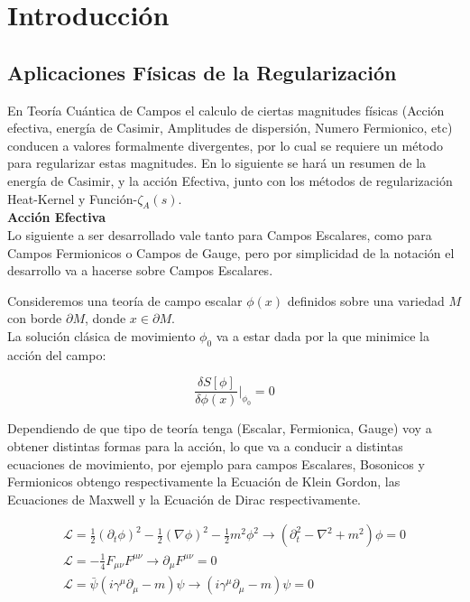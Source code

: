 \chapter{Introducción}


\section{Aplicaciones Físicas de la Regularización}

En Teoría Cuántica de Campos el calculo de ciertas magnitudes físicas (Acción efectiva, energía de Casimir, Amplitudes de dispersión, Numero Fermionico, etc) conducen a valores formalmente divergentes, por lo cual se requiere un método para regularizar estas magnitudes. En lo siguiente se hará un resumen de la energía de Casimir, y la acción Efectiva, junto con los métodos de regularización Heat-Kernel y Función-$ \zeta _A (s) $.\\





\textbf{Acción Efectiva}\\

Lo siguiente a ser desarrollado vale tanto para Campos Escalares, como para Campos Fermionicos o Campos de Gauge, pero por simplicidad de la notación el desarrollo va a hacerse sobre Campos Escalares.

Consideremos una teoría de campo escalar $\phi(x)$ definidos sobre una variedad $M$ con borde $\partial M$, donde $x \in \partial M$. \\

La solución clásica de movimiento $ \phi _0 $ va a estar dada por la que minimice la acción del campo:

\begin{equation}
\frac{\delta S [ \phi ] }{\delta \phi (x)} | _{\phi _0} = 0
\end{equation}


Dependiendo de que tipo de teoría tenga (Escalar, Fermionica, Gauge) voy a obtener distintas formas para la acción, lo que va a conducir a distintas ecuaciones de movimiento, por ejemplo para campos Escalares, Bosonicos y Fermionicos obtengo respectivamente la Ecuación de Klein Gordon, las Ecuaciones de Maxwell y la Ecuación de Dirac respectivamente.

\begin{equation}
\begin{array}{c}
\mathscr{L} = \frac{1}{2} (\partial _t \phi ) ^2 - \frac{1}{2} ( \nabla \phi ) ^2 - \frac{1}{2} m ^2 \phi ^2 
\rightarrow 
\left(
	\partial _t ^2 - \nabla ^2 + m^2 
		\right) \phi = 0 \\
\mathscr{L} = - \frac{1}{4} F _{\mu \nu} F ^{\mu \nu}
\rightarrow \partial _{\mu} F ^{\mu \nu} = 0
 \\
\mathscr{L} = { \bar{\psi} } \left(
			i \gamma ^{\mu} \partial _{\mu} - m 
			\right) \psi 
\rightarrow
			\left( i \gamma ^{\mu} \partial _{\mu}  - m   \right)\psi = 0
\end{array}
\end{equation}




